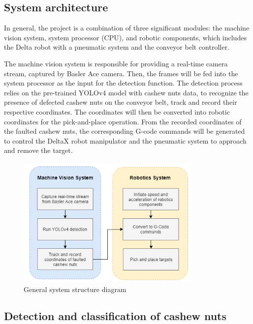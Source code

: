 \documentclass[10pt, letterpaper]{article}
\begin{document}
\subsection{System architecture}
In general, the project is a combination of three significant modules: the machine vision system, system processor (CPU), and robotic components, which includes the Delta robot with a pneumatic system and the conveyor belt controller.\par
The machine vision system is responsible for providing a real-time camera stream, captured by Basler Ace camera. Then, the frames will be fed into the system processor as the input for the detection function. The detection process relies on the pre-trained YOLOv4 model with cashew nuts data, to recognize the presence of defected cashew nuts on the conveyor belt, track and record their respective coordinates. The coordinates will then be converted into robotic coordinates for the pick-and-place operation. From the recorded coordinates of the faulted cashew nuts, the corresponding G-code commands will be generated to control the DeltaX robot manipulator and the pneumatic system to approach and remove the target.\par
\begin{figure}[h]
    \centering
    \includegraphics[width=0.8\textwidth]{fig1.PNG}
    \caption{General system structure diagram}
\end{figure}

\subsection{Detection and classification of cashew nuts}
\end{document}
